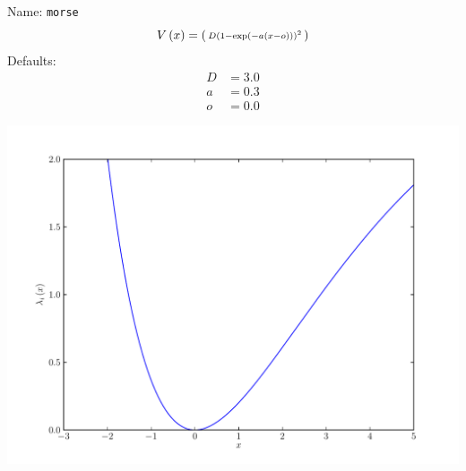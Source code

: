 \documentclass[a4paper,10pt]{report}
\begin{document}
\begin{minipage}{0.5\linewidth}
  Name:    \texttt{morse}
  \begin{equation*}
    V\left( x \right) = \left(\begin{smallmatrix}D \left(1 - \exp\left(-a\left(x-o\right)\right)\right)^2\end{smallmatrix}\right)
  \end{equation*}
  Defaults:
  \begin{align*}
    D &= 3.0 \\
    a &= 0.3 \\
    o &= 0.0
  \end{align*}
\end{minipage}
\begin{minipage}{0.5\linewidth}
  \begin{center}
    \includegraphics[scale=0.25]{./fig/morse.pdf}
  \end{center}
\end{minipage}
\end{document}
